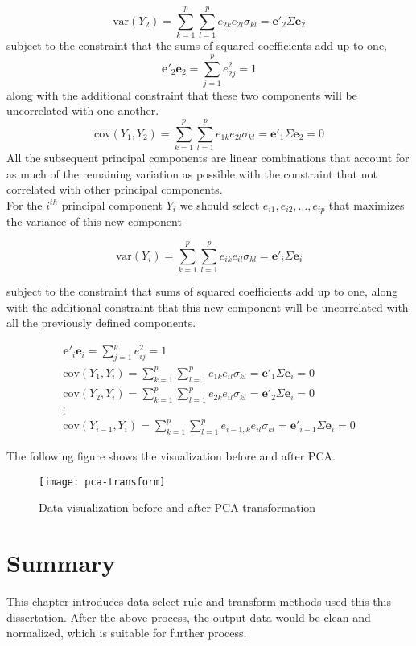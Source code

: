 \begin{equation}
\text{var}(Y_2) = \sum_{k=1}^{p}\sum_{l=1}^{p}e_{2k}e_{2l}\sigma_{kl} = \mathbf{e}'_2\Sigma\mathbf{e}_2
\end{equation}
subject to the constraint that the sums of squared coefficients add up to one,
\begin{equation}
\mathbf{e}'_2\mathbf{e}_2 = \sum_{j=1}^{p}e^2_{2j} = 1
\end{equation}
along with the additional constraint that these two components will be uncorrelated with one another.
\begin{equation}
\text{cov}(Y_1, Y_2) = \sum_{k=1}^{p}\sum_{l=1}^{p}e_{1k}e_{2l}\sigma_{kl} = \mathbf{e}'_1\Sigma\mathbf{e}_2 = 0
\end{equation}
All the subsequent principal components are linear combinations that account for as much of the remaining variation as possible with the constraint that not correlated with other principal components.\\
For the $ i^{th} $ principal component $ Y_i $ we should select $ e_{i1}, e_{i2}, \dots, e_{ip} $ that maximizes the variance of this new component

\begin{equation}
\text{var}(Y_i) = \sum_{k=1}^{p}\sum_{l=1}^{p}e_{ik}e_{il}\sigma_{kl} = \mathbf{e}'_i\Sigma\mathbf{e}_i
\end{equation}

subject to the constraint that sums of squared coefficients add up to one, along with the additional constraint that this new component will be uncorrelated with all the previously defined components.

\begin{gather*}
\mathbf{e}'_i\mathbf{e}_i = \sum_{j=1}^{p}e^2_{ij} = 1\\
\text{cov}(Y_1, Y_i) = \sum_{k=1}^{p}\sum_{l=1}^{p}e_{1k}e_{il}\sigma_{kl} = \mathbf{e}'_1\Sigma\mathbf{e}_i = 0\\
\text{cov}(Y_2, Y_i) = \sum_{k=1}^{p}\sum_{l=1}^{p}e_{2k}e_{il}\sigma_{kl} = \mathbf{e}'_2\Sigma\mathbf{e}_i = 0\\
\vdots\\
\text{cov}(Y_{i-1}, Y_i) = \sum_{k=1}^{p}\sum_{l=1}^{p}e_{i-1,k}e_{il}\sigma_{kl} = \mathbf{e}'_{i-1}\Sigma\mathbf{e}_i = 0
\end{gather*}

The following figure shows the visualization before and after PCA.
\begin{figure}[h]
	\centering
	\texttt{[image: pca-transform]}
	\caption{Data visualization before and after PCA transformation\cite{6_tan_steinbach_kumar_2005}}
\end{figure}


\section{Summary}
This chapter introduces data select rule and transform methods used this this dissertation. After the above process, the output data would be clean and normalized, which is suitable for further process.
